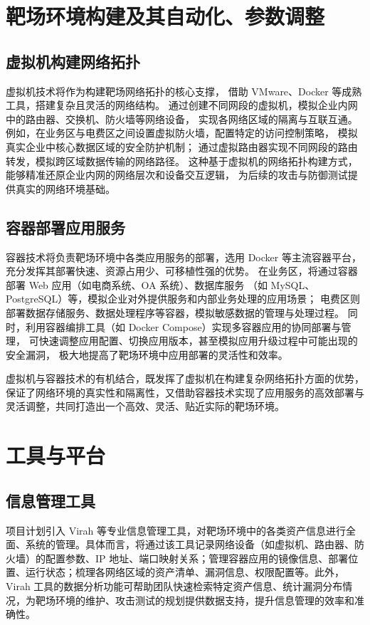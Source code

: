 \documentclass[lang=cn,10pt]{elegantbook}
\begin{document}
\section{靶场环境构建及其自动化、参数调整}
\subsection{虚拟机构建网络拓扑}
虚拟机技术将作为构建靶场网络拓扑的核心支撑，
借助 VMware、Docker 等成熟工具，搭建复杂且灵活的网络结构。
通过创建不同网段的虚拟机，模拟企业内网中的路由器、交换机、防火墙等网络设备，
实现各网络区域的隔离与互联互通。
例如，在业务区与电费区之间设置虚拟防火墙，配置特定的访问控制策略，
模拟真实企业中核心数据区域的安全防护机制；
通过虚拟路由器实现不同网段的路由转发，模拟跨区域数据传输的网络路径。
这种基于虚拟机的网络拓扑构建方式，能够精准还原企业内网的网络层次和设备交互逻辑，
为后续的攻击与防御测试提供真实的网络环境基础。

\subsection{容器部署应用服务}
容器技术将负责靶场环境中各类应用服务的部署，选用 Docker 等主流容器平台，
充分发挥其部署快速、资源占用少、可移植性强的优势。
在业务区，将通过容器部署 Web 应用（如电商系统、OA 系统）、数据库服务
（如 MySQL、PostgreSQL）等，模拟企业对外提供服务和内部业务处理的应用场景；
电费区则部署数据存储服务、数据处理程序等容器，模拟敏感数据的管理与处理过程。
同时，利用容器编排工具（如 Docker Compose）实现多容器应用的协同部署与管理，
可快速调整应用配置、切换应用版本，甚至模拟应用升级过程中可能出现的安全漏洞，
极大地提高了靶场环境中应用部署的灵活性和效率。​

虚拟机与容器技术的有机结合，既发挥了虚拟机在构建复杂网络拓扑方面的优势，保证了网络环境的真实性和隔离性，又借助容器技术实现了应用服务的高效部署与灵活调整，共同打造出一个高效、灵活、贴近实际的靶场环境。​

\section{工具与平台}
\subsection{信息管理工具}
项目计划引入 Virah 等专业信息管理工具，对靶场环境中的各类资产信息进行全面、系统的管理。具体而言，将通过该工具记录网络设备（如虚拟机、路由器、防火墙）的配置参数、IP 地址、端口映射关系；管理容器应用的镜像信息、部署位置、运行状态；梳理各网络区域的资产清单、漏洞信息、权限配置等。此外，Virah 工具的数据分析功能可帮助团队快速检索特定资产信息、统计漏洞分布情况，为靶场环境的维护、攻击测试的规划提供数据支持，提升信息管理的效率和准确性。
\end{document}
